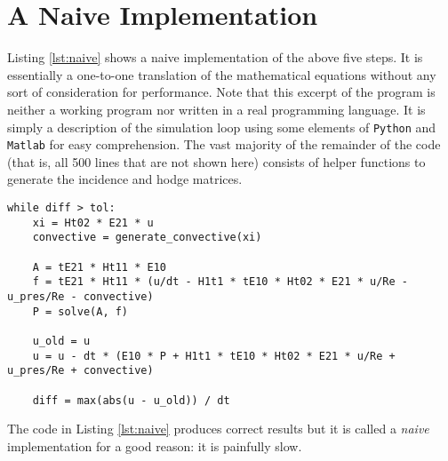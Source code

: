 \section{A Naive Implementation}

Listing \ref{lst:naive} shows a naive implementation of the above five steps. It is essentially a one-to-one translation of the mathematical equations without any sort of consideration for performance. Note that this excerpt of the program is neither a working program nor written in a real programming language. It is simply a description of the simulation loop using some elements of \texttt{Python} and \texttt{Matlab} for easy comprehension. The vast majority of the remainder of the code (that is, all 500 lines that are not shown here) consists of helper functions to generate the incidence and hodge matrices.

\begin{lstlisting}[caption=Code excerpt of a naive implementation., label=lst:naive]
while diff > tol:
    xi = Ht02 * E21 * u
    convective = generate_convective(xi)
    
    A = tE21 * Ht11 * E10
    f = tE21 * Ht11 * (u/dt - H1t1 * tE10 * Ht02 * E21 * u/Re - u_pres/Re - convective)    
    P = solve(A, f)
    
    u_old = u
    u = u - dt * (E10 * P + H1t1 * tE10 * Ht02 * E21 * u/Re + u_pres/Re + convective)
    
    diff = max(abs(u - u_old)) / dt    
\end{lstlisting}

The code in Listing \ref{lst:naive} produces correct results but it is called a \emph{naive} implementation for a good reason: it is painfully slow.
